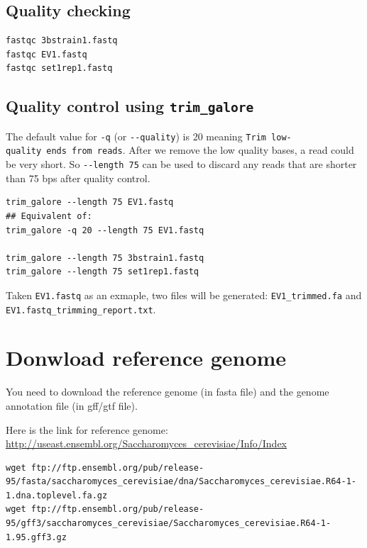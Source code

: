 \documentclass[]{book}
\begin{document}
\hypertarget{quality-checking}{%
\subsection{Quality checking}\label{quality-checking}}

\begin{verbatim}
fastqc 3bstrain1.fastq
fastqc EV1.fastq 
fastqc set1rep1.fastq
\end{verbatim}

\hypertarget{quality-control-using-trim_galore}{%
\subsection{\texorpdfstring{Quality control using \texttt{trim\_galore}}{Quality control using trim\_galore}}\label{quality-control-using-trim_galore}}

The default value for \texttt{-q} (or \texttt{-\/-quality}) is 20 meaning \texttt{Trim\ low-quality\ ends\ from\ reads}. After we remove the low quality bases, a read could be very short. So \texttt{-\/-length\ 75} can be used to discard any reads that are shorter than 75 bps after quality control.

\begin{verbatim}
trim_galore --length 75 EV1.fastq 
## Equivalent of:
trim_galore -q 20 --length 75 EV1.fastq 

trim_galore --length 75 3bstrain1.fastq
trim_galore --length 75 set1rep1.fastq 
\end{verbatim}

Taken \texttt{EV1.fastq} as an exmaple, two files will be generated: \texttt{EV1\_trimmed.fa} and \texttt{EV1.fastq\_trimming\_report.txt}.

\hypertarget{donwload-reference-genome}{%
\section{Donwload reference genome}\label{donwload-reference-genome}}

You need to download the reference genome (in fasta file) and the genome annotation file (in gff/gtf file).

Here is the link for reference genome: \url{http://useast.ensembl.org/Saccharomyces_cerevisiae/Info/Index}

\begin{verbatim}
wget ftp://ftp.ensembl.org/pub/release-95/fasta/saccharomyces_cerevisiae/dna/Saccharomyces_cerevisiae.R64-1-1.dna.toplevel.fa.gz
wget ftp://ftp.ensembl.org/pub/release-95/gff3/saccharomyces_cerevisiae/Saccharomyces_cerevisiae.R64-1-1.95.gff3.gz
\end{verbatim}
\end{document}
